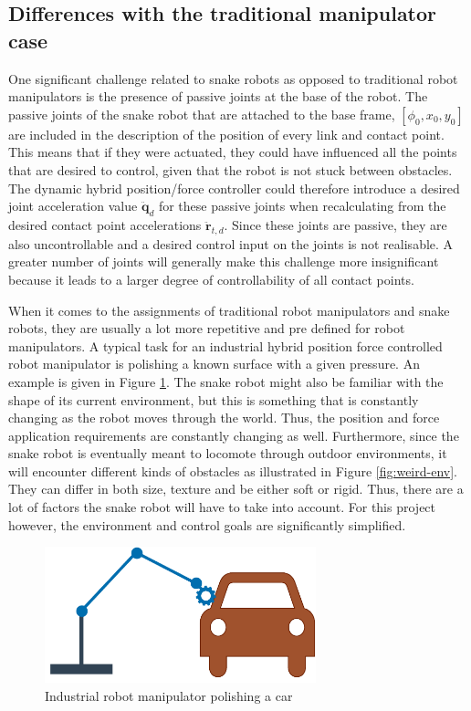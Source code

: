 \subsection{Differences with the traditional manipulator case}

One significant challenge related to snake robots as opposed to traditional robot manipulators is the presence of passive joints at the base of the robot. The passive joints of the snake robot that are attached to the base frame, $[\phi_0, x_0, y_0]$ are included in the description of the position of every link and contact point. This means that if they were actuated, they could have influenced all the points that are desired to control, given that the robot is not stuck between obstacles. The dynamic hybrid position/force controller could therefore introduce a desired joint acceleration value $\ddot{\mathbf{q}}_d$ for these passive joints when recalculating from the desired contact point accelerations $\ddot{\mathbf{r}}_{t,d}$. Since these joints are passive, they are also uncontrollable and a desired control input on the joints is not realisable. A greater number of joints will generally make this challenge more insignificant because it leads to a larger degree of controllability of all contact points.

When it comes to the assignments of traditional robot manipulators and snake robots, they are usually a lot more repetitive and pre defined for robot manipulators. A typical task for an industrial hybrid position force controlled robot manipulator is polishing a known surface with a given pressure. An example is given in Figure \ref{fig:robotman-polish}. The snake robot might also be familiar with the shape of its current environment, but this is something that is constantly changing as the robot moves through the world. Thus, the position and force application requirements are constantly changing as well. Furthermore, since the snake robot is eventually meant to locomote through outdoor environments, it will encounter different kinds of obstacles as illustrated in Figure \ref{fig:weird-env}. They can differ in both size, texture and be either soft or rigid. Thus, there are a lot of factors the snake robot will have to take into account. For this project however, the environment and control goals are significantly simplified.

\begin{figure}
    \centering
    \includegraphics[width=0.7\textwidth]{figures/theory/robotman-polish.pdf}
    \caption{Industrial robot manipulator polishing a car}
    \label{fig:robotman-polish}
\end{figure}

